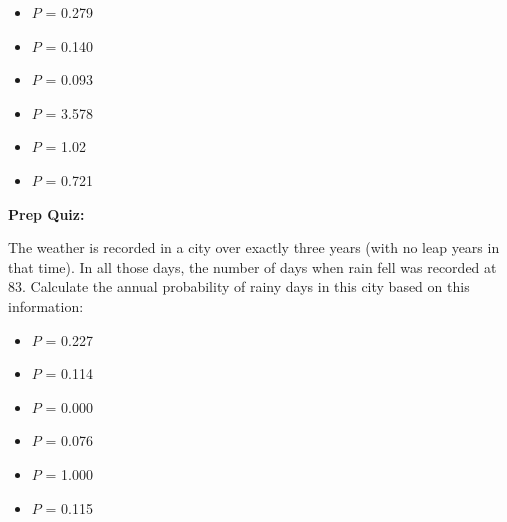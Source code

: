 \begin{itemize}
\item{} $P$ = 0.279
\vskip 5pt 
\item{} $P$ = 0.140
\vskip 5pt 
\item{} $P$ = 0.093
\vskip 5pt 
\item{} $P$ = 3.578
\vskip 5pt 
\item{} $P$ = 1.02
\vskip 5pt 
\item{} $P$ = 0.721
\end{itemize}



\vfil \eject

\noindent
{\bf Prep Quiz:}

The weather is recorded in a city over exactly three years (with no leap years in that time).  In all those days, the number of days when rain fell was recorded at 83.  Calculate the annual probability of rainy days in this city based on this information:

\begin{itemize}
\item{} $P$ = 0.227
\vskip 5pt 
\item{} $P$ = 0.114
\vskip 5pt 
\item{} $P$ = 0.000
\vskip 5pt 
\item{} $P$ = 0.076
\vskip 5pt 
\item{} $P$ = 1.000
\vskip 5pt 
\item{} $P$ = 0.115
\end{itemize}





